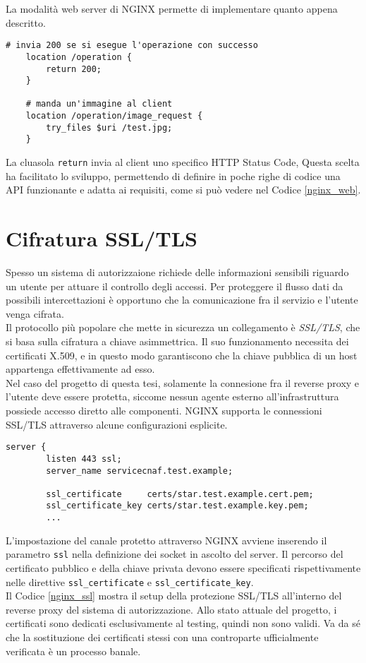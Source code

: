 La modalità web server di NGINX permette di implementare quanto appena descritto.
\lstset{language=nginx}
\begin{lstlisting}[caption={Frammento di codice del service server},captionpos=b,label=nginx_web]
    # invia 200 se si esegue l'operazione con successo
    location /operation {
        return 200;
    }

    # manda un'immagine al client
    location /operation/image_request {
        try_files $uri /test.jpg;
    }
\end{lstlisting}
La cluasola \texttt{return} invia al client uno specifico HTTP Status Code,  
Questa scelta ha facilitato lo sviluppo, permettendo di definire in poche righe di codice una API funzionante e adatta ai requisiti,  
come si può vedere nel Codice \ref*{nginx_web}.

\section{Cifratura SSL/TLS}
Spesso un sistema di autorizzaione richiede delle informazioni sensibili riguardo un utente per attuare il controllo 
degli accessi. 
Per proteggere il flusso dati da possibili intercettazioni è opportuno che la comunicazione fra il servizio e l'utente venga cifrata. 
\\ Il protocollo più popolare che mette in sicurezza un collegamento \newline è \textit{SSL/TLS}, che si basa sulla cifratura a chiave asimmettrica. Il suo funzionamento necessita 
dei certificati X.509, e in questo modo garantiscono che la chiave pubblica di un host appartenga effettivamente ad esso. 
\\ Nel caso del progetto di questa tesi, solamente la connesione fra il reverse proxy e l'utente deve essere protetta, siccome nessun agente esterno
 all'infrastruttura possiede accesso diretto alle componenti.
NGINX supporta le connessioni SSL/TLS attraverso alcune configurazioni esplicite.

\begin{lstlisting}[caption={Configurazione di SSL},captionpos=b,label=nginx_ssl]
    server {
        listen 443 ssl;
        server_name servicecnaf.test.example;
        
        ssl_certificate     certs/star.test.example.cert.pem;
        ssl_certificate_key certs/star.test.example.key.pem;
        ...
\end{lstlisting}
L'impostazione del canale protetto attraverso NGINX avviene inserendo il parametro \texttt{ssl} nella definizione 
dei socket in ascolto del server. Il percorso del certificato pubblico e della chiave privata devono essere specificati 
rispettivamente nelle direttive \texttt{ssl\_certificate} e \texttt{ssl\_certificate\_key}. \\
Il Codice \ref*{nginx_ssl} mostra il setup della protezione SSL/TLS all'interno del reverse proxy del sistema di autorizzazione.
Allo stato attuale del progetto, i certificati sono dedicati esclusivamente al testing, quindi non sono validi. Va da sé che 
la sostituzione dei certificati stessi
con una controparte ufficialmente verificata è un processo banale.  


